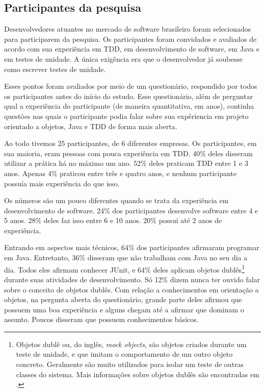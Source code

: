 \documentclass[conference]{IEEEtran}
\begin{document}
\subsection{Participantes da pesquisa}
\label{sec:planejamento-participantes}

Desenvolvedores atuantes no mercado de 
software brasileiro foram selecionados para participarem da pesquisa.
Os participantes foram convidados e avaliados de acordo com sua experiência em TDD,
em desenvolvimento de software, em Java e em testes de unidade. A única exigência
era que o desenvolvedor já soubesse como escrever testes de unidade.

Esses pontos foram avaliados por meio de um questionário, 
respondido por todos os participantes antes do início do estudo. 
Esse questionário, além de perguntar qual a experiência
do participante (de maneira quantitativa, em anos), 
continha questões nas quais o participante
podia falar sobre sua expêriencia em projeto orientado a objetos,
Java e TDD de forma mais aberta.

Ao todo tivemos 25 participantes, de 6 diferentes empresas.
Os participantes, em sua maioria, eram pessoas com pouca experiência em TDD.
40\% deles disseram utilizar a prática há no máximo um ano. 52\% deles praticam TDD
entre 1 e 3 anos. Apenas 4\% praticou entre três e quatro anos, e nenhum participante
possuía mais experiência do que isso. 

Os números são um pouco diferentes quando se trata da experiência em desenvolvimento
de software. 24\% dos participantes desenvolve software entre 4 e 5 anos.
28\% deles faz isso entre 6 e 10 anos. 20\% possui até 2 anos de experiência.

Entrando em aspectos mais técnicos, 64\% dos participantes afirmaram programar em Java. Entretanto,
36\% disseram que não trabalham com Java no seu dia a dia. Todos eles afirmam conhecer JUnit,
e 64\% deles aplicam objetos dublês\footnote{Objetos dublê ou, do inglês, 
\textit{mock objects}, são objetos criados durante um teste de unidade, e que imitam o comportamento de um
outro objeto concreto. Geralmente são muito utilizados para isolar um teste de outras classes
do sistema. Mais informações sobre objetos dublês são encontradas em \cite{mocks}.}
durante suas atividades de desenvolvimento. Só 12\% dizem nunca ter ouvido falar sobre o conceito de objetos dublês. 
Com relação a conhecimentos
em orientação a objetos, na pergunta aberta do questionário, grande parte deles 
afirmou que possuem uma boa experiência e alguns
chegam até a afirmar que dominam o assunto. Poucos disseram que possuem conhecimentos
básicos.
\end{document}
